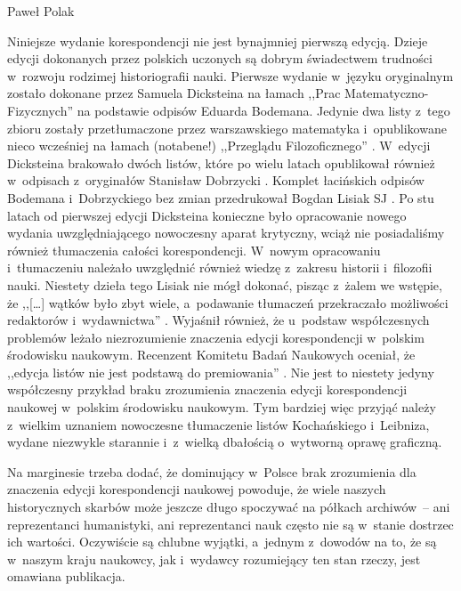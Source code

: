 \begin{recplenv}{Paweł Polak}
\enlargethispage{.5\baselineskip}

Niniejsze wydanie korespondencji nie jest bynajmniej pierwszą edycją. Dzieje edycji dokonanych przez polskich uczonych
są dobrym świadectwem trudności w~rozwoju rodzimej historiografii nauki. Pierwsze wydanie w~języku oryginalnym zostało
dokonane przez Samuela Dicksteina na łamach ,,Prac Matematyczno-Fizycznych''
\parencite{dickstein_korespondencya_1901,dickstein_korespondencya_1902}
na podstawie odpisów Eduarda Bodemana. Jedynie dwa listy z~tego zbioru zostały przetłumaczone przez
warszawskiego matematyka i~opublikowane nieco wcześniej na łamach (notabene!) ,,Przeglądu Filozoficznego''
\parencite{dickstein_wyjatek_1897}.
W~edycji Dicksteina brakowało dwóch listów, które po wielu latach
opublikował również w~odpisach z~oryginałów Stanisław Dobrzycki
\parencite*{dobrzycki_deux_1967}.
Komplet łacińskich
odpisów Bodemana i~Dobrzyckiego bez zmian przedrukował Bogdan Lisiak SJ
\parencite*{lisiak_korespondencja_2005}.
Po stu latach
od pierwszej edycji Dicksteina konieczne było opracowanie nowego wydania uwzględniającego nowoczesny aparat krytyczny,
wciąż nie posiadaliśmy również tłumaczenia całości korespondencji. W~nowym opracowaniu i~tłumaczeniu należało
uwzględnić również wiedzę z~zakresu historii i~filozofii nauki. Niestety dzieła tego Lisiak nie mógł dokonać, pisząc z~żalem
we wstępie, że ,,[…] wątków było zbyt wiele, a~podawanie tłumaczeń przekraczało możliwości redaktorów i~wydawnictwa''
\parencite[s.~9]{lisiak_korespondencja_2005}.
Wyjaśnił również, że u~podstaw współczesnych problemów
leżało niezrozumienie znaczenia edycji korespondencji w~polskim środowisku naukowym. Recenzent Komitetu Badań Naukowych
oceniał, że ,,edycja listów nie jest podstawą do premiowania''
\parencite[s.~10 {[przypis]}]{lisiak_korespondencja_2005}.
Nie jest to niestety jedyny współczesny przykład braku zrozumienia znaczenia edycji korespondencji naukowej w~polskim
środowisku naukowym. Tym bardziej więc przyjąć należy z~wielkim uznaniem nowoczesne tłumaczenie listów
Kochańskiego i~Leibniza, wydane niezwykle starannie i~z~wielką dbałością o~wytworną oprawę graficzną.

Na marginesie trzeba dodać, że dominujący w~Polsce brak zrozumienia dla znaczenia edycji korespondencji naukowej
powoduje, że wiele naszych historycznych skarbów może jeszcze długo spoczywać na półkach archiwów~-- ani reprezentanci
humanistyki, ani reprezentanci nauk często nie są w~stanie dostrzec ich wartości. Oczywiście są chlubne wyjątki, a~jednym z~dowodów
na to, że są w~naszym kraju naukowcy, jak i~wydawcy rozumiejący ten stan rzeczy, jest omawiana
publikacja.


\end{recplenv}
